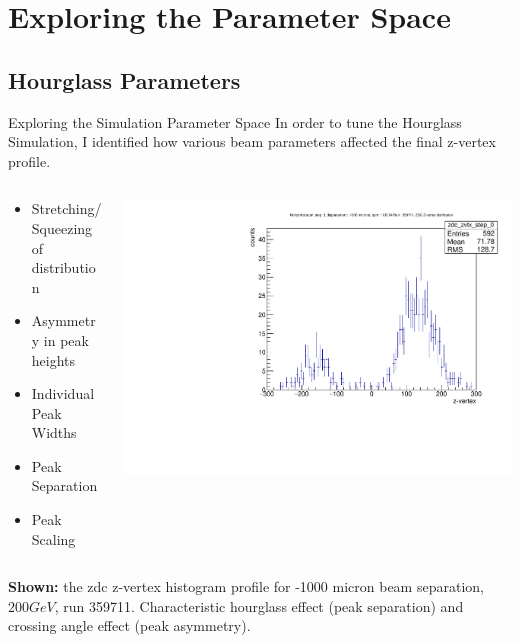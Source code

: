 \section{Exploring the Parameter Space}
\label{ch:HourglassParameterSpace}

\subsection{Hourglass Parameters}
\begin{frame}{Exploring the Simulation Parameter Space}
In order to tune the Hourglass Simulation, I identified how various beam
parameters affected the final z-vertex profile.
\begin{columns}[T] %
\begin{column}[T]{5cm} %
\begin{itemize}
\item Stretching/Squeezing of distribution
\item Asymmetry in peak heights
\item Individual Peak Widths
\item Peak Separation
\item Peak Scaling
\end{itemize}
\end{column}
\begin{column}[T]{5cm} %
\includegraphics[width=\textwidth,height=\textheight,keepaspectratio]{../HourglassParameterSpace/figs/zvertex_profile_hscan_pos_1000_359711.pdf}
\end{column}
\end{columns}
\vspace{\baselineskip}
\textbf{Shown:} the zdc z-vertex histogram profile for -1000 micron beam
separation, $200 GeV$, run 359711. Characteristic hourglass effect (peak
separation) and crossing angle effect (peak asymmetry).
\end{frame}

